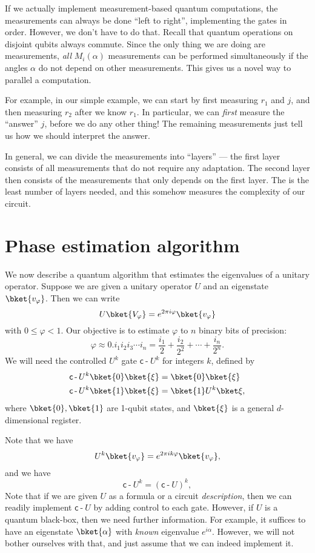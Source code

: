 \documentclass[a4paper]{article}
\newcommand{\qcd}{\mathsf{c}\operatorname{-}}
\begin{document}
If we actually implement measurement-based quantum computations, the measurements can always be done ``left to right'', implementing the gates in order. However, we don't have to do that. Recall that quantum operations on disjoint qubits always commute. Since the only thing we are doing are measurements, \emph{all} $M_i(\alpha)$ measurements can be performed simultaneously if the angles $\alpha$ do not depend on other measurements. This gives us a novel way to parallel a computation.

For example, in our simple example, we can start by first measuring $r_1$ and $j$, and then measuring $r_2$ after we know $r_1$. In particular, we can \emph{first} measure the ``answer'' $j$, before we do any other thing! The remaining measurements just tell us how we should interpret the answer.

In general, we can divide the measurements into ``layers'' --- the first layer consists of all measurements that do not require any adaptation. The second layer then consists of the measurements that only depends on the first layer. The  is the least number of layers needed, and this somehow measures the complexity of our circuit.

\section{Phase estimation algorithm}
We now describe a quantum algorithm that estimates the eigenvalues of a unitary operator. Suppose we are given a unitary operator $U$ and an eigenstate $\bket{v_\varphi}$. Then we can write
\[
  U \bket{V_\varphi} = e^{2\pi i \varphi} \bket{v_\varphi}
\]
with $0 \leq \varphi < 1$. Our objective is to estimate $\varphi$ to $n$ binary bits of precision:
\[
  \varphi \approx 0.i_1 i_2 i_3 \cdots i_n = \frac{i_1}{2} + \frac{i_2}{2^2} + \cdots + \frac{i_n}{2^n}.
\]
We will need the controlled $U^k$ gate $\qcd U^k$ for integers $k$, defined by
\begin{align*}
  \qcd U^k\bket{0}\bket{\xi} &= \bket{0}\bket{\xi}\\
  \qcd U^k\bket{1}\bket{\xi} &= \bket{1} U^k\bket\xi,
\end{align*}
where $\bket{0}, \bket{1}$ are 1-qubit states, and $\bket{\xi}$ is a general $d$-dimensional register.

Note that we have
\[
  U^k \bket{v_\varphi} = e^{2\pi i k \varphi}\bket{v_\varphi},
\]
and we have
\[
  \qcd U^k = (\qcd U)^k,
\]
Note that if we are given $U$ as a formula or a circuit \emph{description}, then we can readily implement $\qcd U$ by adding control to each gate. However, if $U$ is a quantum black-box, then we need further information. For example, it suffices to have an eigenstate $\bket{\alpha}$ with \emph{known} eigenvalue $e^{i\alpha}$. However, we will not bother ourselves with that, and just assume that we can indeed implement it.
\end{document}
